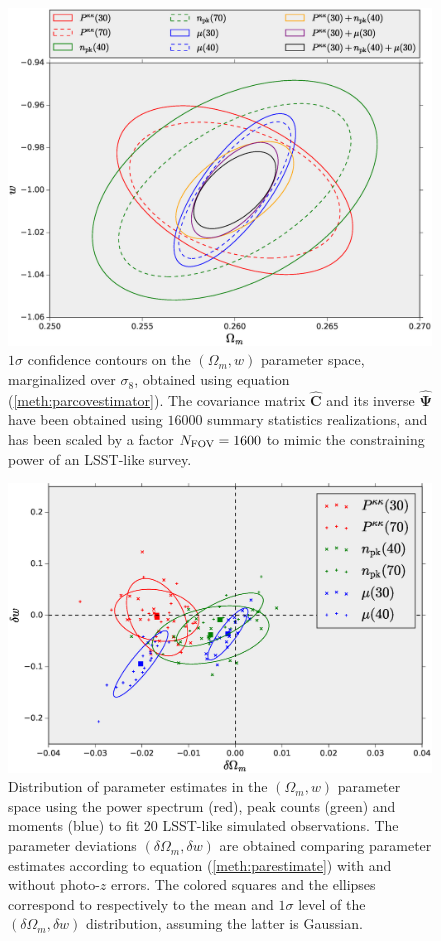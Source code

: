 \documentclass[reprint,aps,prd,superscriptaddress,showkeys,showpacs]{revtex4-1}
\newcommand{\bbh}[1]{\mathbf{\hat{#1}}}
\begin{document}
\begin{figure}
\includegraphics[scale=0.3]{Figures/constraints_Om-w.eps}
\caption{$1\sigma$ confidence contours on the $(\Omega_m,w)$ parameter space, marginalized over $\sigma_8$, obtained using equation (\ref{meth:parcovestimator}). The covariance matrix $\bbh{C}$ and its inverse $\bbh{\Psi}$ have been obtained using $16000$ summary statistics realizations, and has been scaled by a factor $N_{\rm FOV}=1600$ to mimic the constraining power of an LSST-like survey.}
\label{fig:constraintsOm-w}
\end{figure}

\begin{figure}
\includegraphics[scale=0.3]{Figures/photoz_bias_Om-w.eps}
\caption{Distribution of parameter estimates in the $(\Omega_m,w)$ parameter space using the power spectrum (red), peak counts (green) and moments (blue) to fit 20 LSST-like simulated observations. The parameter deviations $(\delta\Omega_m,\delta w)$ are obtained comparing parameter estimates according to equation (\ref{meth:parestimate}) with and without photo-$z$ errors. The colored squares and the ellipses correspond to respectively to the mean and $1\sigma$ level of the $(\delta\Omega_m,\delta w)$ distribution, assuming the latter is Gaussian.}
\label{fig:photozbias}
\end{figure}
\end{document}
